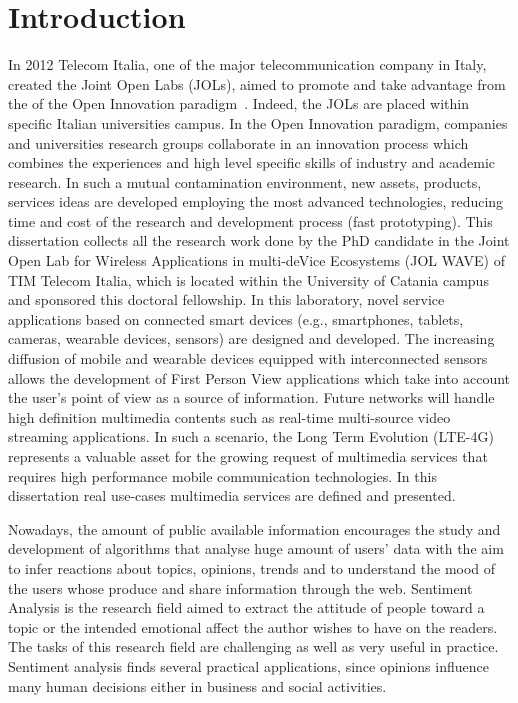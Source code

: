 \chapter{Introduction}
In 2012 Telecom Italia, one of the major telecommunication company in Italy, created the Joint Open Labs (JOLs), aimed to promote and take advantage from the of the Open Innovation paradigm~\cite{chesbrough2006open}. Indeed, the JOLs are placed within specific Italian universities campus. In the Open Innovation paradigm, companies and universities research groups collaborate in an innovation process which combines the experiences and high level specific skills of industry and academic research.
In such a mutual contamination environment, new assets, products, services ideas are developed employing the most advanced
technologies, reducing time and cost of the research and development process (fast prototyping).
This dissertation collects all the research work done by the PhD candidate in the Joint Open Lab for Wireless Applications in multi-deVice Ecosystems (JOL WAVE) of TIM Telecom Italia, which is located within the University of Catania campus and sponsored this doctoral fellowship. In this laboratory, novel service applications based on connected smart devices (e.g., smartphones, tablets, cameras, wearable devices, sensors) are designed and developed.
The increasing diffusion of mobile and wearable devices equipped with interconnected sensors allows the development of First Person View applications which take into account the user's point of view as a source of information.
Future networks will handle high definition multimedia contents such as real-time multi-source video streaming applications. In such a scenario, the Long Term Evolution (LTE-4G)~\cite{sesia2011lte} represents a valuable asset for the growing request of multimedia services that requires high performance mobile communication technologies.
In this dissertation real use-cases multimedia services are defined and presented. %

Nowadays, the amount of public available information encourages the study and development of algorithms that analyse huge amount of users' data with the aim to infer reactions about topics, opinions, trends and to understand the mood of the users whose produce and share information through the web. Sentiment Analysis is the research field aimed to extract the attitude of people toward a topic or the intended emotional affect the author wishes to have on the readers. The tasks of this research field are challenging as well as very useful in practice. Sentiment analysis finds several practical applications, since opinions influence many human decisions either in business and social activities.  

